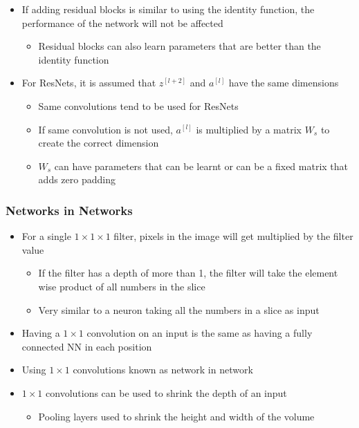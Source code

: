 \documentclass[12pt, letterpaper]{article}
\begin{document}
\begin{itemize}
\begin{itemize}
        \end{itemize}
        \item If adding residual blocks is similar to using the identity function, the performance of the network will not be affected
        \begin{itemize}
            \item Residual blocks can also learn parameters that are better than the identity function
        \end{itemize}
        \item For ResNets, it is assumed that $z^{[l+2]}$ and $a^{[l]}$ have the same dimensions
        \begin{itemize}
            \item Same convolutions tend to be used for ResNets
            \item If same convolution is not used, $a^{[l]}$ is multiplied by a matrix $W_s$ to create the correct dimension
            \item $W_s$ can have parameters that can be learnt or can be a fixed matrix that adds zero padding
        \end{itemize}
    \end{itemize}

    \subsubsection{Networks in Networks}
    \begin{itemize}
        \item For a single $1\times 1\times 1$ filter, pixels in the image will get multiplied by the filter value
        \begin{itemize}
            \item If the filter has a depth of more than 1, the filter will take the element wise product of all numbers in the slice 
            \item Very similar to a neuron taking all the numbers in a slice as input
        \end{itemize}
        \item Having a $1\times 1$ convolution on an input is the same as having a fully connected NN in each position
        \item Using $1\times 1$ convolutions known as network in network
        \item $1\times 1$ convolutions can be used to shrink the depth of an input
        \begin{itemize}
            \item Pooling layers used to shrink the height and width of the volume
        \end{itemize}
    \end{itemize}
\end{document}
